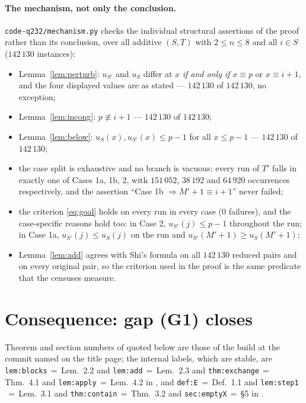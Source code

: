 \documentclass[11pt]{article}
\theoremstyle{definition}
\begin{document}
\paragraph{The mechanism, not only the conclusion.}
\texttt{code-q232/mechanism.py} checks the individual structural assertions of the proof rather
than its conclusion, over all additive $(S,T)$ with $2\le n\le8$ and all $i\in S$
($142\,130$ instances):
\begin{itemize}
\item Lemma~\ref{lem:perturb}: $u_{S'}$ and $u_S$ differ at $x$ \emph{if and only if} $x\equiv
p$ or $x\equiv i+1$, and the four displayed values are as stated --- $142\,130$ of
$142\,130$, no exception;
\item Lemma~\ref{lem:incong}: $p\not\equiv i+1$ --- $142\,130$ of $142\,130$;
\item Lemma~\ref{lem:below}: $u_S(x),u_{S'}(x)\le p-1$ for all $x\le p-1$ --- $142\,130$ of
$142\,130$;
\item the case split is exhaustive and no branch is vacuous: every run of $T'$ falls in exactly
one of Cases 1a, 1b, 2, with $151\,052$, $38\,192$ and $64\,920$ occurrences respectively, and
the assertion ``Case 1b $\Rightarrow M'+1\equiv i+1$'' never failed;
\item the criterion \eqref{eq:goal} holds on every run in every case ($0$ failures), and the
case-specific reasons hold too: in Case 2, $u_{S'}(j)\le p-1$ throughout the run; in Case 1a,
$u_{S'}(j)\le u_S(j)$ on the run and $u_{S'}(M'+1)\ge u_S(M'+1)$;
\item Lemma~\ref{lem:add} agrees with Shi's formula on all $142\,130$ reduced pairs and on
every original pair, so the criterion used in the proof is the same predicate that the
censuses measure.
\end{itemize}

\section{Consequence: gap (G1) closes}\label{sec:consequence}

Theorem and section numbers of \cite{Clio2,Clio3} quoted below are those of the build at the
commit named on the title page; the internal labels, which are stable, are
\texttt{lem:blocks}$\,=\,$Lem.~2.2 and \texttt{lem:add}$\,=\,$Lem.~2.3 and
\texttt{thm:exchange}$\,=\,$Thm.~4.1 and \texttt{lem:apply}$\,=\,$Lem.~4.2 in \cite{Clio2},
and \texttt{def:E}$\,=\,$Def.~1.1 and \texttt{lem:step1}$\,=\,$Lem.~3.1 and
\texttt{thm:contain}$\,=\,$Thm.~3.2 and \texttt{sec:emptyX}$\,=\,$\S5 in \cite{Clio3}.
\end{document}
